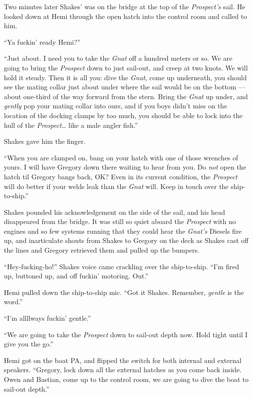 \documentclass[]{scrbook}
\begin{document}
Two minutes later Shakes' was on the bridge at the top of the
\emph{Prospect's} sail. He looked down at Hemi through the open hatch
into the control room and called to him.

``Ya fuckin' ready Hemi?''

``Just about. I need you to take the \emph{Gnat} off a hundred meters or
so. We are going to bring the \emph{Prospect} down to just sail-out, and
creep at two knots. We will hold it steady. Then it is all you: dive the
\emph{Gnat}, come up underneath, you should see the mating collar just
about under where the sail would be on the bottom --- about one-third of
the way forward from the stern. Bring the \emph{Gnat} up under, and
\emph{gently} pop your mating collar into ours, and if you boys didn't
miss on the location of the docking clamps by too much, you should be
able to lock into the hull of the \emph{Prospect}\ldots{} like a male
angler fish.''

Shakes gave him the finger.

``When you are clamped on, bang on your hatch with one of those wrenches
of yours. I will have Gregory down there waiting to hear from you. Do
\emph{not} open the hatch til Gregory bangs back, OK? Even in its
current condition, the \emph{Prospect} will do better if your welds leak
than the \emph{Gnat} will. Keep in touch over the ship-to-ship.''

Shakes pounded his acknowledgement on the side of the sail, and his head
disappeared from the bridge. It was still so quiet aboard the
\emph{Prospect} with no engines and so few systems running that they
could hear the \emph{Gnat's} Diesels fire up, and inarticulate shouts
from Shakes to Gregory on the deck as Shakes cast off the lines and
Gregory retrieved them and pulled up the bumpers.

``Hey-fucking-ho!'' Shakes voice came crackling over the ship-to-ship.
``I'm fired up, buttoned up, and off fuckin' motoring. Out.''

Hemi pulled down the ship-to-ship mic. ``Got it Shakes. Remember,
\emph{gentle} is the word.''

``I'm allllways fuckin' gentle.''

``We are going to take the \emph{Prospect} down to sail-out depth now.
Hold tight until I give you the go.''

Hemi got on the boat PA, and flipped the switch for both internal and
external speakers. ``Gregory, lock down all the external hatches as you
come back inside. Owen and Bastian, come up to the control room, we are
going to dive the boat to sail-out depth.''
\end{document}
